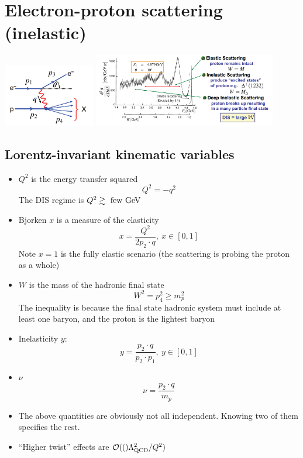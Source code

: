 \section{Electron-proton scattering (inelastic)}
\begin{center}
  \includegraphics[width=0.3\textwidth]{figs/disfeyn.png}
  \includegraphics[width=0.6\textwidth]{figs/epxsec.png}
\end{center}
\subsection{Lorentz-invariant kinematic variables}
\begin{itemize}
  \item $Q^2$ is the energy transfer squared
  \begin{equation}
    Q^2 = -q^2
  \end{equation}
  The DIS regime is $Q^2\gtrsim \text{ few}~\text{GeV}$
  \item Bjorken $x$ is a measure of the elasticity
  \begin{equation}
    x = \frac{Q^2}{2p_2\cdot q}, ~ x\in [0,1]
  \end{equation}
  Note $x=1$ is the fully elastic scenario (the scattering is probing the proton as a whole)
  \item $W$ is the mass of the hadronic final state
  \begin{equation}
    W^2 = p_4^2 \geq m_p^2
  \end{equation}
  The inequality is because the final state hadronic system must include at least one baryon, and the proton is the lightest baryon
  \item Inelasticity $y$:
  \begin{equation}
    y = \frac{p_2\cdot q}{p_2\cdot p_1}, ~ y\in [0,1]
  \end{equation}
  \item $\nu$
  \begin{equation}
    \nu = \frac{p_2\cdot q}{m_p}
  \end{equation}
  \item The above quantities are obviously not all independent. Knowing two of them specifies the rest. 
  \item ``Higher twist'' effects are $\mathcal{O}(()\Lambda_\text{QCD}^2/Q^2)$
\end{itemize}

